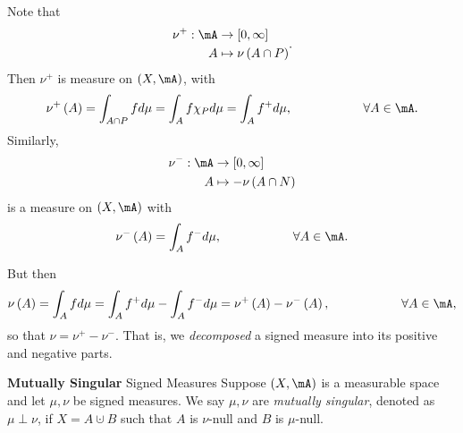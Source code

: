 \documentclass[pmath451]{subfiles}
\begin{document}
\begin{example}{}
        Note that
        \begin{equation*}
            \begin{aligned}
                \nu^+:\mA&\to\left[ 0,\infty \right] \\
                A&\mapsto\nu\left( A\cap P \right)
            \end{aligned} .
        \end{equation*}
        Then $\nu^+$ is measure on $\left( X,\mA \right)$, with
        \begin{equation*}
            \nu^+\left( A \right) = \int_{A\cap P}fd\mu = \int_A f\chi_Pd\mu = \int_Af^+d\mu,\hspace{2cm}\forall A\in\mA.
        \end{equation*}
        Similarly,
        \begin{equation*}
            \begin{aligned}
                \nu^-:\mA&\to\left[ 0,\infty \right] \\
                A&\mapsto-\nu\left( A\cap N \right)
            \end{aligned} 
        \end{equation*}
        is a measure on $\left( X,\mA \right)$ with
        \begin{equation*}
            \nu^-\left( A \right) = \int_Af^-d\mu,\hspace{2cm}\forall A\in\mA.
        \end{equation*}
        
        But then
        \begin{equation*}
            \nu\left( A \right) = \int_Afd\mu = \int_Af^+d\mu - \int_Af^-d\mu = \nu^+\left( A \right)-\nu^-\left( A \right), \hspace{2cm}\forall A\in\mA,
        \end{equation*}
        so that $\nu=\nu^+-\nu^-$. That is, we \textit{decomposed} a signed measure into its positive and negative parts.
    \end{example}

    \rruleline

    \clearpage
    
    \begin{definition}{\textbf{Mutually Singular} Signed Measures}
        Suppose $\left( X,\mA \right)$ is a measurable space and let $\mu,\nu$ be signed measures. We say $\mu,\nu$ are \emph{mutually singular}, denoted as $\mu\perp\nu$, if $X=A\cupdot B$ such that $A$ is $\nu$-null and $B$ is $\mu$-null.
    \end{definition}
    
\end{document}

